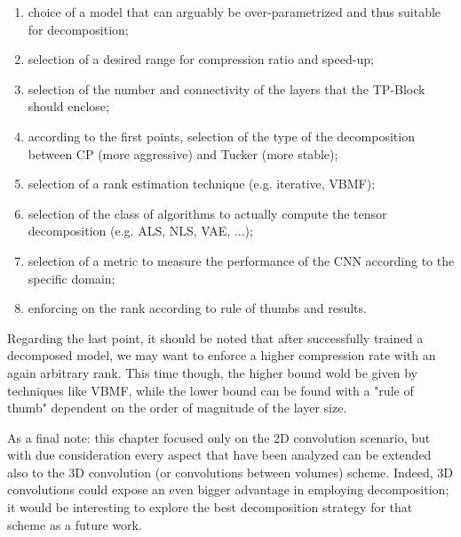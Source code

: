 \begin{enumerate}
    \item choice of a model that can arguably be over-parametrized and thus suitable for decomposition; 
    
    \item selection of a desired range for compression ratio and speed-up;
    
    \item selection of the number and connectivity of the layers that the TP-Block should enclose;
    
    \item according to the first points, selection of the type of the decomposition between CP (more aggressive) and Tucker (more stable); 
    
    \item selection of a rank estimation technique (e.g. iterative, VBMF);
    
    \item selection of the class of algorithms to actually compute the tensor decomposition (e.g. ALS, NLS, VAE, ...);
    
    \item selection of a metric to measure the performance of the CNN according to the specific domain;
    
    \item enforcing on the rank according to rule of thumbs and results. 
    
\end{enumerate}

Regarding the last point, it should be noted that after successfully trained a decomposed model, we may want to enforce a higher compression rate with an again arbitrary rank. This time though, the higher bound wold be given by  techniques like VBMF, while the lower bound can be found with a "rule of thumb" dependent on the order of magnitude of the layer size.

As a final note: this chapter focused only on the 2D convolution scenario, but with due consideration every aspect that have been analyzed can be extended also to the 3D convolution (or convolutions between volumes) scheme. Indeed, 3D convolutions could expose an even bigger advantage in employing decomposition; it would be interesting to explore the best decomposition strategy for that scheme as a future work.


